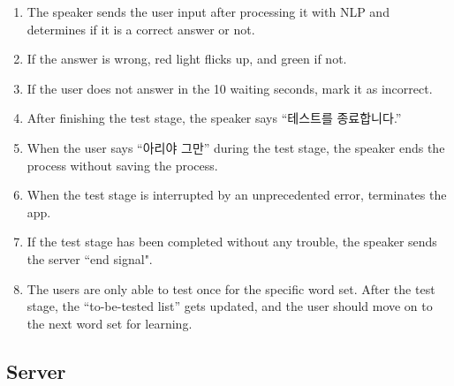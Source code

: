 \documentclass[conference]{IEEEtran}
\begin{document}
\begin{enumerate}
\begin{enumerate}
        \item The speaker sends the user input after processing it with NLP and determines if it is a correct answer or not.
        \item If the answer is wrong, red light flicks up, and green if not.
        \item If the user does not answer in the 10 waiting seconds, mark it as incorrect.
        \item After finishing the test stage, the speaker says “테스트를 종료합니다.”
        \item When the user says “아리야 그만” during the test stage, the speaker ends the process without saving the process.
        \item When the test stage is interrupted by an unprecedented error, terminates the app.
        \item If the test stage has been completed without any trouble, the speaker sends the server “end signal".
        \item The users are only able to test once for the specific word set. After the test stage, the “to-be-tested list” gets updated, and the user should move on to the next word set for learning.
    \end{enumerate}
\end{enumerate}


\subsection{Server}
\end{document}
